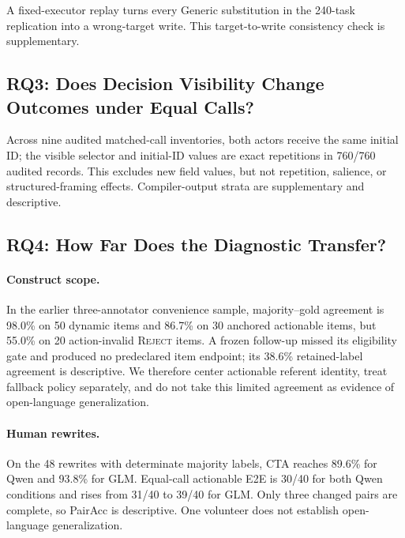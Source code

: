 \documentclass[letterpaper]{article}
\begin{document}
A fixed-executor replay turns every Generic substitution in the 240-task replication into a
wrong-target write. This target-to-write consistency check is supplementary.

\subsection{RQ3: Does Decision Visibility Change Outcomes under Equal Calls?}
%

Across nine audited matched-call inventories, both actors receive the same initial ID; the visible
selector and initial-ID values are exact repetitions in 760/760 audited records. This excludes new field values,
but not repetition, salience, or structured-framing effects. Compiler-output strata are
supplementary and descriptive.

\subsection{RQ4: How Far Does the Diagnostic Transfer?}

\paragraph{Construct scope.}
In the earlier three-annotator convenience sample, majority--gold agreement is 98.0\% on 50 dynamic
items and 86.7\% on 30 anchored actionable items, but 55.0\% on 20 action-invalid \textsc{Reject}
items. A frozen follow-up missed its eligibility gate and produced no predeclared item endpoint;
its 38.6\% retained-label agreement is descriptive. We therefore center actionable referent
identity, treat fallback policy separately, and do not take this limited agreement as evidence of
open-language generalization.

\paragraph{Human rewrites.}
On the 48 rewrites with determinate majority labels, CTA reaches 89.6\% for Qwen and 93.8\% for GLM.
Equal-call actionable E2E is 30/40 for both Qwen conditions and rises from 31/40 to 39/40 for GLM.
Only three changed pairs are complete, so PairAcc is descriptive. One volunteer does not establish
open-language generalization.
\end{document}
